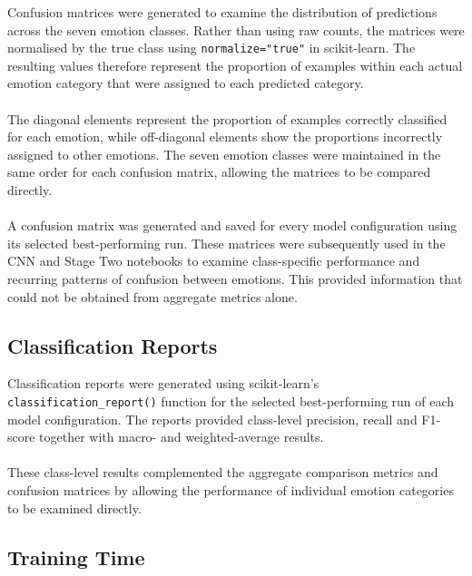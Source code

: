 \documentclass[12pt, a4paper]{report}
\let\oldsubsection\subsection
\renewcommand{\subsection}{%
    \Needspace{6\baselineskip}%
    \oldsubsection
}
\begin{document}
				Confusion matrices were generated to examine the distribution of predictions across the seven emotion classes. Rather than using raw counts, the matrices were normalised by the true class using \texttt{normalize="true"} in scikit-learn. The resulting values therefore represent the proportion of examples within each actual emotion category that were assigned to each predicted category.\\\\
				The diagonal elements represent the proportion of examples correctly classified for each emotion, while off-diagonal elements show the proportions incorrectly assigned to other emotions. The seven emotion classes were maintained in the same order for each confusion matrix, allowing the matrices to be compared directly.\\\\
				A confusion matrix was generated and saved for every model configuration using its selected best-performing run. These matrices were subsequently used in the CNN and Stage Two notebooks to examine class-specific performance and recurring patterns of confusion between emotions. This provided information that could not be obtained from aggregate metrics alone.
				
			\subsection{Classification Reports}
				
				Classification reports were generated using scikit-learn's \texttt{classification\_report()} function for the selected best-performing run of each model configuration. The reports provided class-level precision, recall and F1-score together with macro- and weighted-average results.\\\\
				These class-level results complemented the aggregate comparison metrics and confusion matrices by allowing the performance of individual emotion categories to be examined directly.
				
			\subsection{Training Time}
				
\end{document}
